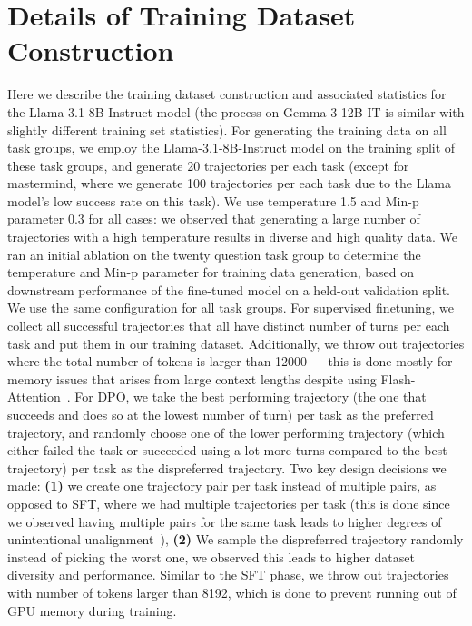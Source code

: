 \documentclass{article}
\theoremstyle{plain}
\theoremstyle{definition}
\theoremstyle{remark}
\begin{document}
\section{Details of Training Dataset Construction}
Here we describe the training dataset construction and associated statistics for the Llama-3.1-8B-Instruct model (the process on Gemma-3-12B-IT is similar with slightly different training set statistics). For generating the training data on all task groups, we employ the Llama-3.1-8B-Instruct model on the training split of these task groups, and generate 20 trajectories per each task (except for mastermind, where we generate 100 trajectories per each task due to the Llama model's low success rate on this task). We use temperature 1.5 and Min-p parameter $0.3$ for all cases: we observed that generating a large number of trajectories with a high temperature results in diverse and high quality data. We ran an initial ablation on the twenty question task group to determine the temperature and Min-p parameter for training data generation, based on downstream performance of the fine-tuned model on a held-out validation split. We use the same configuration for all task groups.
For supervised finetuning, we collect all successful trajectories that all have distinct number of turns per each task and put them in our training dataset. Additionally, we throw out trajectories where the total number of tokens is larger than 12000 --- this is done mostly for memory issues that arises from large context lengths despite using Flash-Attention~\citep{dao2022flashattention,dao2023flashattention2}.
For DPO, we take the best performing trajectory (the one that succeeds and does so at the lowest number of turn) per task as the preferred trajectory, and randomly choose one of the lower performing trajectory (which either failed the task or succeeded using a lot more turns compared to the best trajectory) per task as the dispreferred trajectory. Two key design decisions we made: \textbf{(1)} we create one trajectory pair per task instead of multiple pairs, as opposed to SFT, where we had multiple trajectories per task (this is done since we observed having multiple pairs for the same task leads to higher degrees of unintentional unalignment~\citep{razin2024unintentionalunalignmentlikelihooddisplacement}), \textbf{(2)} We sample the dispreferred trajectory randomly instead of picking the worst one, we observed this leads to higher dataset diversity and performance. Similar to the SFT phase, we throw out trajectories with number of tokens larger than 8192, which is done to prevent running out of GPU memory during training.
\end{document}
